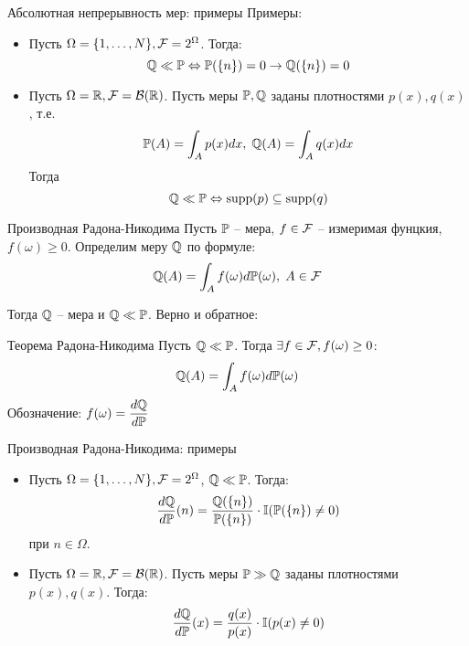 \documentclass[aspectratio=169]{beamer}
\begin{document}
\begin{frame}{Абсолютная непрерывность мер: примеры}
    Примеры:    
    \begin{itemize}
            \item Пусть $\Omega = \{1, \ldots, N\}, \mathcal{F}=2^{\Omega}$. Тогда:
                $$
                    \mathbb{Q} \ll \mathbb{P} \Leftrightarrow \mathbb{P}(\{n\}) = 0 \to \mathbb{Q}(\{n\}) = 0
                $$
        \end{itemize}
        \pause
        \begin{itemize}
        \item Пусть $\Omega=\mathbb{R}, \mathcal{F} = \mathcal{B}(\mathbb{R})$. Пусть меры $\mathbb{P}, \mathbb{Q}$ заданы плотностями $p(x), q(x)$, т.е.
        $$
            \mathbb{P}(A) = \int_A p(x) dx, \; \mathbb{Q}(A) = \int_A q(x) dx
        $$
        Тогда
        $$
            \mathbb{Q} \ll \mathbb{P} \Leftrightarrow \mathrm{supp}(p) \subseteq\mathrm{supp}(q)
        $$
        \end{itemize}
\end{frame}

\begin{frame}{Производная Радона-Никодима}
    Пусть $\mathbb{P}$ -- мера, $f \in \mathcal{F}$ -- измеримая фунцкия, $f(\omega)\geq 0$. Определим меру $\mathbb{Q}$ по формуле:
    $$
        \mathbb{Q}(A) = \int_A f(\omega) d\mathbb{P}(\omega), \; A \in \mathcal{F}
    $$
    
    Тогда $\mathbb{Q}$ -- мера и $\mathbb{Q} \ll \mathbb{P}$. 
    \pause 
    Верно и обратное:
    \begin{block}{Теорема Радона-Никодима}
        Пусть $\mathbb{Q} \ll \mathbb{P}$. Тогда $\exists f \in \mathcal{F}, f(\omega) \geq 0$:
        $$
            \mathbb{Q}(A) = \int_A f(\omega) d\mathbb{P}(\omega)
        $$Обозначение: $f(\omega) = \dfrac{d\mathbb{Q}}{d\mathbb{P}}$
    \end{block}
\end{frame}

\begin{frame}{Производная Радона-Никодима: примеры}
    \begin{itemize}
        \item Пусть $\Omega = \{1, \ldots, N\}, \mathcal{F}=2^{\Omega}$, $\mathbb{Q} \ll \mathbb{P}$.
        Тогда:
            $$
                \dfrac{d\mathbb{Q}}{d\mathbb{P}}(n) = \dfrac{\mathbb{Q}(\{n\})}{\mathbb{P}(\{n\})} \cdot \mathbb{I}(\mathbb{P}(\{n\}) \neq 0)
            $$при $n \in \Omega$.
        \pause
        \item Пусть $\Omega=\mathbb{R}, \mathcal{F} = \mathcal{B}(\mathbb{R})$. Пусть меры $\mathbb{P} \gg \mathbb{Q}$ заданы плотностями $p(x), q(x)$. 
        Тогда:
            $$
                \dfrac{d\mathbb{Q}}{d\mathbb{P}}(x) = \dfrac{q(x)}{p(x)} \cdot \mathbb{I}(p(x) \neq 0)
            $$
    \end{itemize}
\end{frame}
\end{document}
